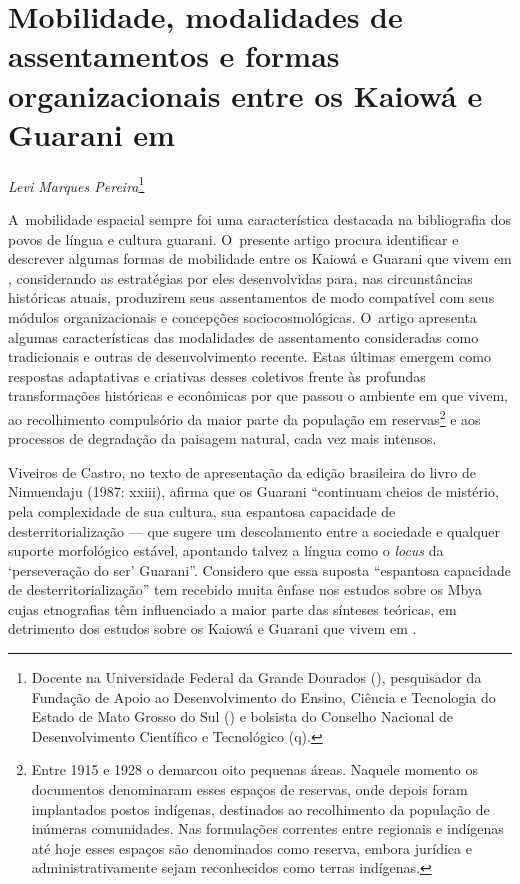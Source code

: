 \chapter*{Mobilidade, modalidades de assentamentos e formas organizacionais entre
os Kaiowá e Guarani em }

\@openrighttrue\makeatother

\begin{flushright}
\emph{Levi Marques Pereira}\footnote{Docente na Universidade Federal da
Grande Dourados (), pesquisador da Fundação de Apoio ao Desenvolvimento do Ensino, Ciência e Tecnologia do Estado de Mato Grosso do Sul () e bolsista do Conselho Nacional de Desenvolvimento Científico e Tecnológico (q).} 
\end{flushright}

\noindent
A~mobilidade espacial sempre foi uma característica destacada na
bibliografia dos povos de língua e cultura guarani. O~presente artigo
procura identificar e descrever algumas formas de mobilidade entre os
Kaiowá e Guarani que vivem em , considerando as estratégias por eles
desenvolvidas para, nas circunstâncias históricas atuais, produzirem
seus assentamentos de modo compatível com seus módulos organizacionais
e concepções sociocosmológicas. O~artigo apresenta algumas
características das modalidades de assentamento consideradas como
tradicionais e outras de desenvolvimento recente. Estas últimas emergem
como respostas adaptativas e criativas desses coletivos frente às
profundas transformações históricas e econômicas por que passou o
ambiente em que vivem, ao recolhimento compulsório da maior parte da
população em reservas\footnote{Entre 1915 e 1928 o  demarcou oito
pequenas áreas. Naquele momento os documentos denominaram esses espaços
de reservas, onde depois foram implantados postos indígenas, destinados
ao recolhimento da população de inúmeras comunidades. Nas formulações
correntes entre regionais e indígenas até hoje esses espaços são
denominados como reserva, embora jurídica e administrativamente sejam
reconhecidos como terras indígenas.} e aos processos de degradação
da paisagem natural, cada vez mais intensos.

Viveiros de Castro, no texto de apresentação da edição brasileira do
livro de Nimuendaju (1987: xxiii), afirma que os Guarani ``continuam
cheios de mistério, pela complexidade de sua cultura, sua espantosa
capacidade de desterritorialização --- que sugere um descolamento entre a
sociedade e qualquer suporte morfológico estável, apontando talvez a
língua como o \emph{locus} da ‘perseveração do ser’ Guarani''. Considero que
essa suposta ``espantosa capacidade de desterritorialização'' tem
recebido muita ênfase nos estudos sobre os Mbya cujas etnografias têm
influenciado a maior parte das sínteses teóricas, em detrimento dos
estudos sobre os Kaiowá e Guarani que vivem em . 


